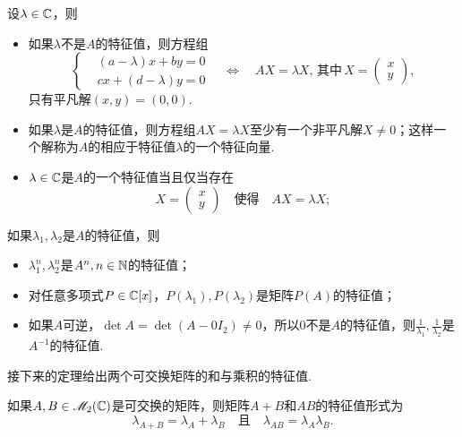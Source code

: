 \begin{mybox}
  设$\lambda\in\mathbb C$，则
  \begin{itemize}
    \item 如果$\lambda$不是$A$的特征值，则方程组
      \[
        \left\{
          \begin{aligned}
            & (a-\lambda)x + by = 0 \\
            & cx + (d-\lambda)y = 0
          \end{aligned}
        \right.\quad \Leftrightarrow\quad
        AX = \lambda X,\,\text{其中}\,X = \begin{pmatrix}
          x \\ y
        \end{pmatrix},
      \]
      只有平凡解$(x,y)=(0,0)$.
    \item 如果$\lambda$是$A$的特征值，则方程组$AX=\lambda X$至少有一个非平凡解$X\ne0$；这样一个解称为$A$的相应于特征值$\lambda$的一个{\kaishu 特征向量}.
    \item $\lambda \in\mathbb C$是$A$的一个特征值当且仅当存在
        \[
          X = \begin{pmatrix}
            x \\ y
          \end{pmatrix}\quad \text{使得} \quad AX=\lambda X;
        \]
  \end{itemize}

    如果$\lambda_1,\lambda_2$是$A$的特征值，则
    \begin{itemize}
      \item $\lambda_1^n,\lambda_2^n$是$A^n,n\in\mathbb N$的特征值；
      \item 对任意多项式$P\in\mathbb C[x]$，$P(\lambda_1),P(\lambda_2)$是矩阵$P(A)$的特征值；
      \item 如果$A$可逆，$\det A=\det(A-0I_2)\ne0$，所以0不是$A$的特征值，则$\frac1{\lambda_1},\frac1{\lambda_2}$是$A^{-1}$的特征值.
    \end{itemize}
\end{mybox}

接下来的定理给出两个可交换矩阵的和与乘积的特征值.

\begin{mybox}
  \begin{theorem}[两个可交换矩阵的和与乘积的特征值.]

    如果$A,B\in\mathscr M_2(\mathbb C)$是可交换的矩阵，则矩阵$A+B$和$AB$的特征值形式为
    \[
      \lambda_{A+B} = \lambda_A + \lambda _B
      \quad \text{且} \quad \lambda_{AB} = \lambda_A\lambda_B.
    \]
  \end{theorem}
\end{mybox}

